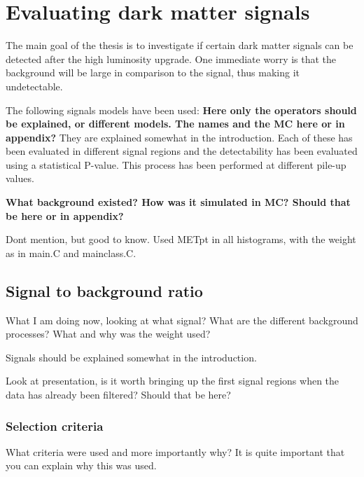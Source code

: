 \chapter{Evaluating dark matter signals}
The main goal of the thesis is to investigate if certain dark matter signals can be detected after the high luminosity upgrade. One immediate worry is that the background will be large in comparison to the signal, thus making it undetectable. 

The following signals models have been used:
\textbf{Here only the operators should be explained, or different models. The names and the MC here or in appendix?} They are explained somewhat in the introduction.
Each of these has been evaluated in different signal regions and the detectability has been evaluated using a statistical P-value. This process has been performed at different pile-up values. 

\textbf{What background existed? How was it simulated in MC? Should that be here or in appendix?}


Dont mention, but good to know. Used METpt in all histograms, with the weight as in main.C and mainclass.C. 


\section{Signal to background ratio}
What I am doing now, looking at what signal? What are the different background processes? What and why was the weight used?

Signals should be explained somewhat in the introduction.



Look at presentation, is it worth bringing up the first signal regions when the data has already been filtered? Should that be here?
 
\subsection{Selection criteria}
What criteria were used and more importantly why? It is quite important that you can explain why this was used.

